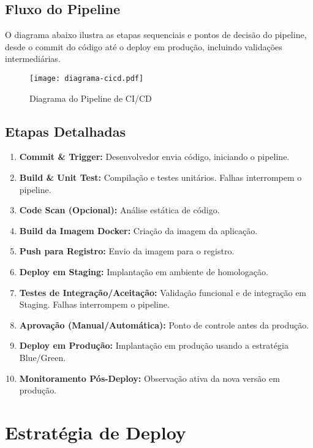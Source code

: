 \subsection{Fluxo do Pipeline}
\label{subsec:cicd-fluxo}
O diagrama abaixo ilustra as etapas sequenciais e pontos de decisão do pipeline, desde o commit do código até o deploy em produção, incluindo validações intermediárias.

\begin{figure}[htbp]
    \centering
    \texttt{[image: diagrama-cicd.pdf]}
    \caption{Diagrama do Pipeline de CI/CD}
    \label{fig:diagrama-cicd}
\end{figure}

\subsection{Etapas Detalhadas}
\label{subsec:cicd-etapas}
\begin{enumerate}
    \item \textbf{Commit \& Trigger:} Desenvolvedor envia código, iniciando o pipeline.
    \item \textbf{Build \& Unit Test:} Compilação e testes unitários. Falhas interrompem o pipeline.
    \item \textbf{Code Scan (Opcional):} Análise estática de código.
    \item \textbf{Build da Imagem Docker:} Criação da imagem da aplicação.
    \item \textbf{Push para Registro:} Envio da imagem para o registro.
    \item \textbf{Deploy em Staging:} Implantação em ambiente de homologação.
    \item \textbf{Testes de Integração/Aceitação:} Validação funcional e de integração em Staging. Falhas interrompem o pipeline.
    \item \textbf{Aprovação (Manual/Automática):} Ponto de controle antes da produção.
    \item \textbf{Deploy em Produção:} Implantação em produção usando a estratégia Blue/Green.
    \item \textbf{Monitoramento Pós-Deploy:} Observação ativa da nova versão em produção.
\end{enumerate}

\section{Estratégia de Deploy}
\label{sec:estrategia-deploy}

